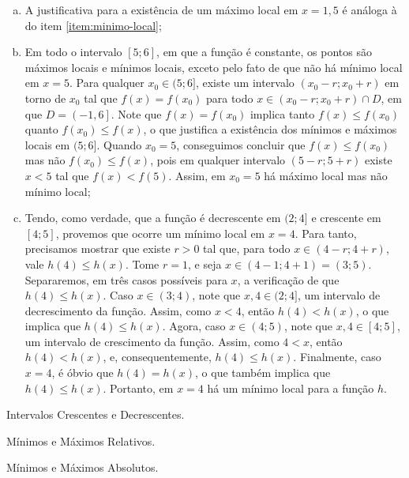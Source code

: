 \begin{solution}
\begin{enumerate}[(a)]
        No item \ref{item:minimo-local-formal}, é demonstrado que, de fato, há um mínimo local em $x=4$.
        \item A justificativa para a existência de um máximo local em $x=1{,}5$ é análoga à do item \ref{item:minimo-local};
        \item Em todo o intervalo $[5; 6]$, em que a função é constante, 
        os pontos são máximos locais e mínimos locais, exceto pelo fato de que não há mínimo local em $x=5$. 
        Para qualquer $x_0\in (5;6]$, existe um intervalo $(x_0 - r; x_0+r)$ em torno de $x_0$ tal que $f(x)= f(x_0)$ para todo $x \in (x_0 - r; x_0+r) \cap D$, em que $D = \left(-1,6\right]$.
        Note que $f(x)= f(x_0)$ implica tanto $f(x) \leq f(x_0)$ quanto $f(x_0)\leq f(x)$, 
        o que justifica a existência dos mínimos e máximos locais em $(5;6]$. 
        Quando $x_0=5$, conseguimos concluir que $f(x) \le f(x_0)$ mas não $f(x_0) \le f(x)$, 
        pois em qualquer intervalo $(5 - r; 5+r)$ existe $x < 5$ tal que $f(x) < f(5)$.
        Assim, em $x_0=5$ há máximo local mas não mínimo local;
        \item \label{item:minimo-local-formal} Tendo, como verdade, que a função é decrescente em $(2; 4]$ e crescente em $[4; 5]$, 
        provemos que ocorre um mínimo local em $x=4$. Para tanto, precisamos mostrar que existe $r>0$ tal que, 
        para todo $x \in (4-r; 4+r)$, vale $h(4) \leq h(x)$. 
        Tome $r=1$, e seja $x \in (4-1; 4+1) = (3; 5)$. 
        Separaremos, em três casos possíveis para $x$, a verificação de que $h(4) \leq h(x)$. 
        Caso $x \in (3; 4)$, note que $x, 4 \in (2; 4]$, um intervalo de decrescimento da função. 
        Assim, como $x<4$, então $h(4)< h(x)$, o que implica que $h(4) \leq h(x)$. 
        Agora, caso $x \in (4; 5)$, note que $x, 4 \in [4; 5]$, um intervalo de crescimento da função. 
        Assim, como $4<x$, então $h(4)< h(x)$, e, consequentemente, $h(4)\le h(x)$.
        Finalmente, caso $x=4$, é óbvio que $h(4)=h(x)$, o que também implica que $h(4)\le h(x)$. 
        Portanto, em $x=4$ há um mínimo local para a função $h$.
    \end{enumerate}
\end{solution}

\begin{onlineact}
    {Intervalos Crescentes e Decrescentes}.
\end{onlineact}

\begin{onlineact}
    {Mínimos e Máximos Relativos}.
\end{onlineact}

\begin{onlineact}
    {Mínimos e Máximos Absolutos}.
\end{onlineact}